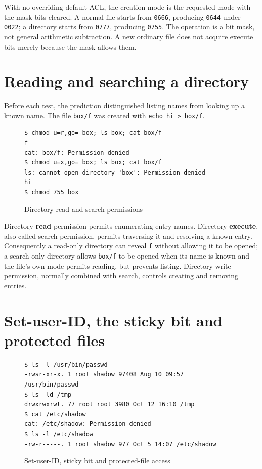 \documentclass{../latex/utmreport}
\begin{document}
With no overriding default ACL, the creation mode is the requested mode
with the mask bits cleared. A normal file starts from \texttt{0666},
producing \texttt{0644} under \texttt{0022}; a directory starts from
\texttt{0777}, producing \texttt{0755}. The operation is a bit mask, not
general arithmetic subtraction. A new ordinary file does not acquire
execute bits merely because the mask allows them.

\section{Reading and searching a
directory}\label{reading-and-searching-a-directory}

Before each test, the prediction distinguished listing names from
looking up a known name. The file \texttt{box/f} was created with
\texttt{echo\ hi\ \textgreater{}\ box/f}.

\begin{figure}[H]
\begin{lstlisting}
$ chmod u=r,go= box; ls box; cat box/f
f
cat: box/f: Permission denied
$ chmod u=x,go= box; ls box; cat box/f
ls: cannot open directory 'box': Permission denied
hi
$ chmod 755 box
\end{lstlisting}
\caption{Directory read and search permissions}
\end{figure}

Directory \textbf{read} permission permits enumerating entry names.
Directory \textbf{execute}, also called search permission, permits
traversing it and resolving a known entry. Consequently a read-only
directory can reveal \texttt{f} without allowing it to be opened; a
search-only directory allows \texttt{box/f} to be opened when its name
is known and the file's own mode permits reading, but prevents listing.
Directory write permission, normally combined with search, controls
creating and removing entries.

\section{Set-user-ID, the sticky bit and protected
files}\label{set-user-id-the-sticky-bit-and-protected-files}

\begin{figure}[H]
\begin{lstlisting}
$ ls -l /usr/bin/passwd
-rwsr-xr-x. 1 root shadow 97408 Aug 10 09:57 /usr/bin/passwd
$ ls -ld /tmp
drwxrwxrwt. 77 root root 3980 Oct 12 16:10 /tmp
$ cat /etc/shadow
cat: /etc/shadow: Permission denied
$ ls -l /etc/shadow
-rw-r-----. 1 root shadow 977 Oct 5 14:07 /etc/shadow
\end{lstlisting}
\caption{Set-user-ID, sticky bit and protected-file access}
\end{figure}
\end{document}
